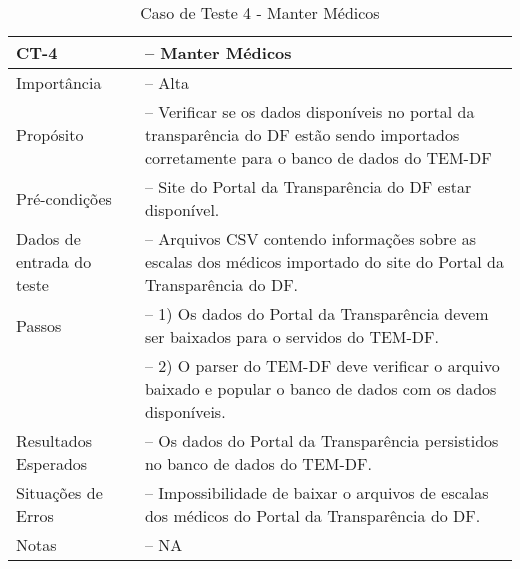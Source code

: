 \begin{anexosenv}
\begin{longtable}{p{4cm}>{-- }p{9cm}}
  \caption{Caso de Teste 4 - Manter Médicos}\label{tab:ct4} \\
  \toprule
  \noindent
  CT-4                      & Manter Médicos\\ \midrule
  Importância               & Alta\\ \midrule
  Propósito                 & Verificar se os dados disponíveis no portal da transparência do DF estão sendo importados corretamente para o banco de dados do TEM-DF\\ \midrule
  Pré-condições             & Site do Portal da Transparência do DF estar disponível.\\ \midrule
  Dados de entrada do teste & Arquivos CSV contendo informações sobre as escalas dos médicos importado do site do Portal da Transparência do DF.\\ \midrule
  Passos                    & 1) Os dados do Portal da Transparência devem ser baixados para o servidos do TEM-DF.\\
                            & 2) O parser do TEM-DF deve verificar o arquivo baixado e popular o banco de dados com os dados disponíveis.\\ \midrule
  Resultados Esperados      & Os dados do Portal da Transparência persistidos no banco de dados do TEM-DF.\\ \midrule
  Situações de Erros        & Impossibilidade de baixar o arquivos de escalas dos médicos do Portal da Transparência do DF.\\ \midrule
  Notas                     & NA                              \\ \bottomrule
\end{longtable}


\end{anexosenv}
